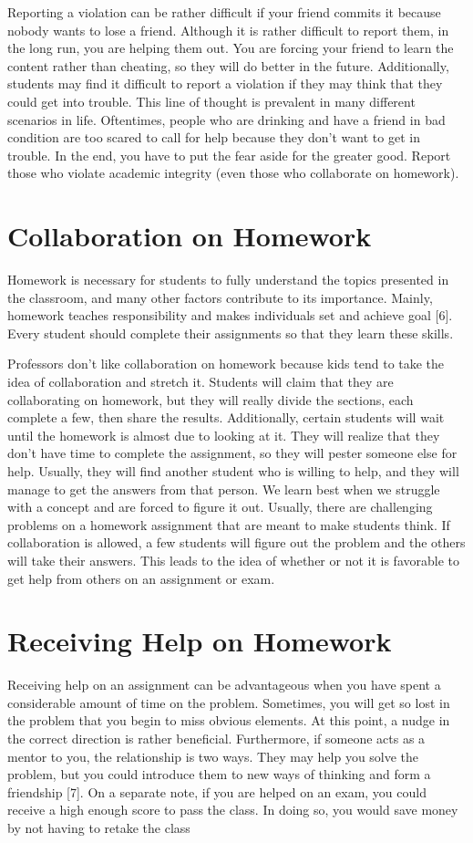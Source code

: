 \documentclass[11pt]{article}
\begin{document}
Reporting a violation can be rather difficult if your friend commits it because nobody wants to lose a friend. Although it is rather difficult to report them, in the long run, you are helping them out. You are forcing your friend to learn the content rather than cheating, so they will do better in the future. Additionally, students may find it difficult to report a violation if they may think that they could get into trouble. This line of thought is prevalent in many different scenarios in life. Oftentimes, people who are drinking and have a friend in bad condition are too scared to call for help because they don’t want to get in trouble. In the end, you have to put the fear aside for the greater good. Report those who violate academic integrity (even those who collaborate on homework). 

\section{Collaboration on Homework}
Homework is necessary for students to fully understand the topics presented in the classroom, and many other factors contribute to its importance. Mainly, homework teaches responsibility and makes individuals set and achieve goal [6]. Every student should complete their assignments so that they learn these skills.  

Professors don’t like collaboration on homework because kids tend to take the idea of collaboration and stretch it. Students will claim that they are collaborating on homework, but they will really divide the sections, each complete a few, then share the results. Additionally, certain students will wait until the homework is almost due to looking at it. They will realize that they don’t have time to complete the assignment, so they will pester someone else for help. Usually, they will find another student who is willing to help, and they will manage to get the answers from that person. We learn best when we struggle with a concept and are forced to figure it out. Usually, there are challenging problems on a homework assignment that are meant to make students think. If collaboration is allowed, a few students will figure out the problem and the others will take their answers. This leads to the idea of whether or not it is favorable to get help from others on an assignment or exam. 

\section{Receiving Help on Homework}
Receiving help on an assignment can be advantageous when you have spent a considerable amount of time on the problem. Sometimes, you will get so lost in the problem that you begin to miss obvious elements. At this point, a nudge in the correct direction is rather beneficial. Furthermore, if someone acts as a mentor to you, the relationship is two ways. They may help you solve the problem, but you could introduce them to new ways of thinking and form a friendship [7]. On a separate note, if you are helped on an exam, you could receive a high enough score to pass the class. In doing so, you would save money by not having to retake the class  
\end{document}
